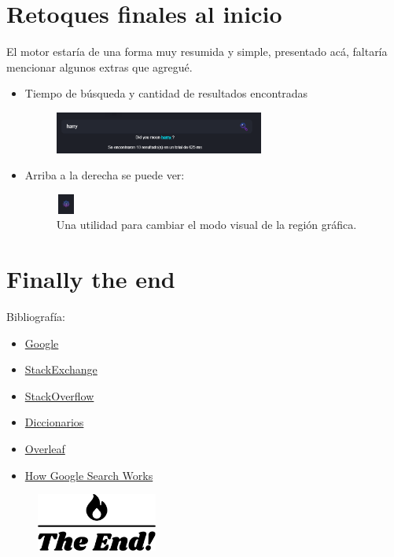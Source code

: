 \renewcommand*{\figurename}{Dato}

\section*{Retoques finales al inicio}
\begin{frame}
    El motor estaría de una forma muy resumida y simple, presentado acá, faltaría mencionar algunos extras que agregué.
    \begin{itemize}
        \item Tiempo de búsqueda y cantidad de resultados encontradas
        \begin{figure}
            \centering
            \includegraphics[width=260px]{Assets/time_results.png}
        \end{figure}
        \item Arriba a la derecha se puede ver:
        \begin{figure}
            \includegraphics[height=25px, width=25px]{Assets/mode.png}
            \caption{Una utilidad para cambiar el modo visual de la región gráfica.}
        \end{figure}
    \end{itemize}
\end{frame}

\section*{Finally the end}
\begin{frame}
    Bibliografía:
    \begin{itemize}
        \item \href{https://google.com}{Google}
        \item \href{https://stackexchange.com}{StackExchange}
        \item \href{https://stackoverflow.com}{StackOverflow}
        \item \href{https://learn.microsoft.com/en-us/dotnet/csharp/programming-guide/classes-and-structs/how-to-initialize-a-dictionary-with-a-collection-initializer}{Diccionarios}
        \item \href{https://overleaf.com}{Overleaf}
        \item \href{https://developers.google.com/search/docs/fundamentals/how-search-works}{How Google Search Works}
    \end{itemize}
\end{frame}

\begin{frame}
    \begin{figure}
        \centering
        \includegraphics[width=150px]{Assets/the_end.png}
    \end{figure}
\end{frame}